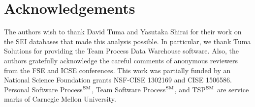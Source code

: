 \documentclass[smallcondensed]{svjour3}
\begin{document}
\section*{Acknowledgements}
The authors wish to thank  David Tuma and  Yasutaka Shirai for their work on the SEI databases
that made this analysis possible.
In particular, we thank Tuma Solutions for providing the Team Process Data Warehouse software.
Also, the authors gratefully acknowledge the careful comments of anonymous reviewers from the
FSE and ICSE conferences.
This work was partially funded by an National Science
Foundation grants NSF-CISE 1302169 and CISE 1506586.
Personal Software Process$\textsuperscript{SM}$, Team Software Process$\textsuperscript{SM}$, and TSP$\textsuperscript{SM}$ are service marks of Carnegie Mellon University.

 
\vspace*{0.5mm} 
\balance

 

\newpage
{}
 \setcounter{page}{1}
 

\end{document}
